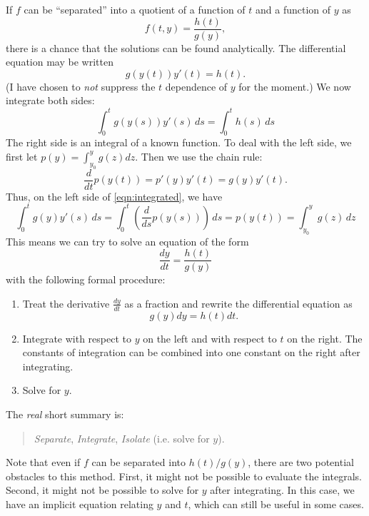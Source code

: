 \documentclass[reqno]{immbook}
\numberwithin{equation}{chapter}
\numberwithin{question}{section}
\numberwithin{theorem}{chapter}
\numberwithin{figure}{chapter}
\theoremstyle{definition}
\begin{document}
\medskip
If $f$ can be ``separated'' into a quotient of a function of $t$ and a function
of $y$ as
\begin{equation}
   f(t,y) = \frac{h(t)}{g(y)},
\end{equation}
there is a chance that the solutions can
be found analytically.
The differential equation may be written
\begin{equation}
  g(y(t))y'(t) = h(t).
\label{eqn:separated}
\end{equation}
(I have chosen to \emph{not} suppress the $t$ dependence of
$y$ for the moment.)
We now integrate both sides:
\begin{equation}
    \int_0^t g(y(s))y'(s) \, ds = \int_0^t h(s) \, ds
\label{eqn:integrated}
\end{equation}
The right side is an integral of a known function.
To deal with the left side, we first let $p(y) = \int_{y_0}^y g(z) dz$.
Then  we use the chain rule:
\begin{equation}
   \frac{d}{dt} p(y(t)) = p'(y)y'(t) = g(y)y'(t).
\end{equation}
Thus, on the left side of \eqref{eqn:integrated}, we have
\begin{equation}
  \int_0^t g(y)y'(s)\,ds = \int_0^t \left(\frac{d}{ds} p(y(s))\right)\, ds = p(y(t)) = 
    \int_{y_0}^y g(z) \, dz
\end{equation}
This means we can try to solve an equation of the form
\begin{equation}
   \frac{dy}{dt} = \frac{h(t)}{g(y)}
\end{equation}
with the following formal procedure:
\begin{enumerate}
\item Treat the derivative $\frac{dy}{dt}$ as a fraction and rewrite the differential equation
as
\begin{equation}
   g(y)dy = h(t)dt.
\end{equation}
\item Integrate with respect to $y$ on the left and with respect to $t$ on the right.
The constants of integration can be combined into one constant on the right after
integrating.
\item Solve for $y$.
\end{enumerate}
The \emph{real} short summary is:
\begin{quote}
  \emph{Separate}, \emph{Integrate}, \emph{Isolate} (i.e. solve for $y$).
\end{quote}
Note that even if $f$ can be separated into $h(t)/g(y)$, there are two potential obstacles
to this method. First, it might not be possible to evaluate the integrals.
Second, it might not be possible to solve for $y$ after integrating.
In this case, we have an implicit equation relating $y$ and $t$, which can still
be useful in some cases.
\end{document}
